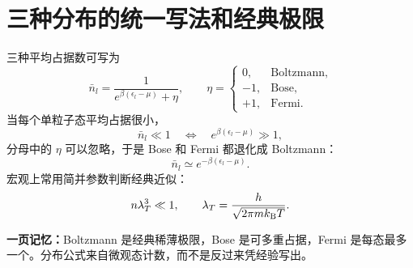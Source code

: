 \section{三种分布的统一写法和经典极限}

三种平均占据数可写为
\[
  \bar n_l
  =
  \frac{1}{e^{\beta(\epsilon_l-\mu)}+\eta},
\qquad
  \eta=
  \begin{cases}
    0, & \text{Boltzmann},\\
    -1, & \text{Bose},\\
    +1, & \text{Fermi}.
  \end{cases}
\]
当每个单粒子态平均占据很小，
\[
  \bar n_l\ll 1
  \quad\Longleftrightarrow\quad
  e^{\beta(\epsilon_l-\mu)}\gg 1,
\]
分母中的 $\eta$ 可以忽略，于是 Bose 和 Fermi 都退化成 Boltzmann：
\[
  \bar n_l\simeq e^{-\beta(\epsilon_l-\mu)}.
\]
宏观上常用简并参数判断经典近似：
\[
  n\lambda_T^3\ll 1,\qquad
  \lambda_T=\frac{h}{\sqrt{2\pi mk_{\mathrm B} T}}.
\]

\begin{keybox}
\textbf{一页记忆：}Boltzmann 是经典稀薄极限，Bose 是可多重占据，Fermi 是每态最多一个。分布公式来自微观态计数，而不是反过来凭经验写出。
\end{keybox}
